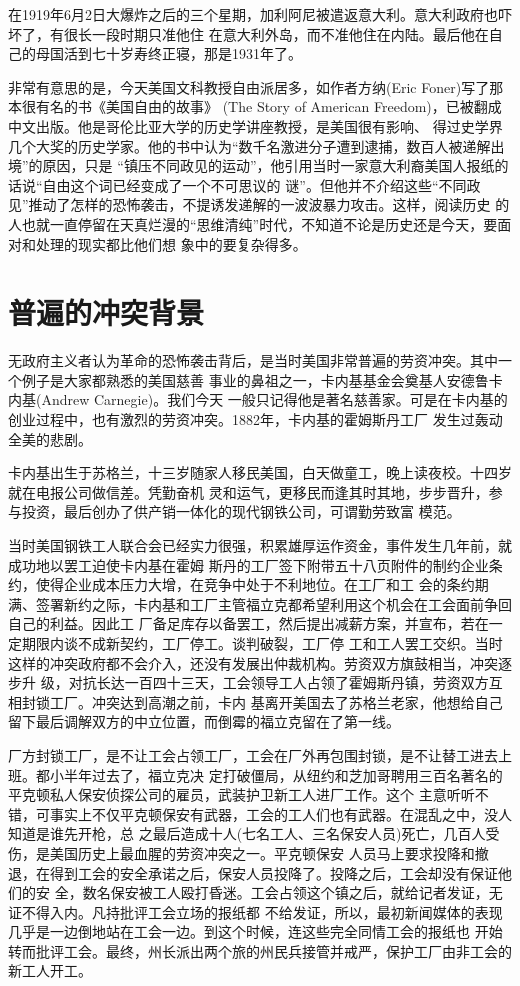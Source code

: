 \documentclass[10pt]{article}
\begin{document}
{在1919年6月2日大爆炸之后的三个星期，加利阿尼被遣返意大利。意大利政府也吓坏了，有很长一段时期只准他住
在意大利外岛，而不准他住在内陆。最后他在自己的母国活到七十岁寿终正寝，那是1931年了。

非常有意思的是，今天美国文科教授自由派居多，如作者方纳(Eric Foner)写了那本很有名的书《美国自由的故事》
(The Story of American Freedom)，已被翻成中文出版。他是哥伦比亚大学的历史学讲座教授，是美国很有影响、
得过史学界几个大奖的历史学家。他的书中认为``数千名激进分子遭到逮捕，数百人被递解出境''的原因，只是
``镇压不同政见的运动''，他引用当时一家意大利裔美国人报纸的话说``自由这个词已经变成了一个不可思议的
谜''。但他并不介绍这些``不同政见''推动了怎样的恐怖袭击，不提诱发递解的一波波暴力攻击。这样，阅读历史
的人也就一直停留在天真烂漫的``思维清纯''时代，不知道不论是历史还是今天，要面对和处理的现实都比他们想
象中的要复杂得多。

\pagebreak
\section{普遍的冲突背景}

无政府主义者认为革命的恐怖袭击背后，是当时美国非常普遍的劳资冲突。其中一个例子是大家都熟悉的美国慈善
事业的鼻祖之一，卡内基基金会奠基人\myrule 安德鲁\textperiodcentered 卡内基(Andrew Carnegie)。我们今天
一般只记得他是著名慈善家。可是在卡内基的创业过程中，也有激烈的劳资冲突。1882年，卡内基的霍姆斯丹工厂
发生过轰动全美的悲剧。

卡内基出生于苏格兰，十三岁随家人移民美国，白天做童工，晚上读夜校。十四岁就在电报公司做信差。凭勤奋机
灵和运气，更移民而逢其时其地，步步晋升，参与投资，最后创办了供产销一体化的现代钢铁公司，可谓勤劳致富
模范。

当时美国钢铁工人联合会已经实力很强，积累雄厚运作资金，事件发生几年前，就成功地以罢工迫使卡内基在霍姆
斯丹的工厂签下附带五十八页附件的制约企业条约，使得企业成本压力大增，在竞争中处于不利地位。在工厂和工
会的条约期满、签署新约之际，卡内基和工厂主管福立克都希望利用这个机会在工会面前争回自己的利益。因此工
厂备足库存以备罢工，然后提出减薪方案，并宣布，若在一定期限内谈不成新契约，工厂停工。谈判破裂，工厂停
工和工人罢工交织。当时这样的冲突政府都不会介入，还没有发展出仲裁机构。劳资双方旗鼓相当，冲突逐步升
级，对抗长达一百四十三天，工会领导工人占领了霍姆斯丹镇，劳资双方互相封锁工厂。冲突达到高潮之前，卡内
基离开美国去了苏格兰老家，他想给自己留下最后调解双方的中立位置，而倒霉的福立克留在了第一线。

厂方封锁工厂，是不让工会占领工厂，工会在厂外再包围封锁，是不让替工进去上班。都小半年过去了，福立克决
定打破僵局，从纽约和芝加哥聘用三百名著名的平克顿私人保安侦探公司的雇员，武装护卫新工人进厂工作。这个
主意听听不错，可事实上不仅平克顿保安有武器，工会的工人们也有武器。在混乱之中，没人知道是谁先开枪，总
之最后造成十人(七名工人、三名保安人员)死亡，几百人受伤，是美国历史上最血腥的劳资冲突之一。平克顿保安
人员马上要求投降和撤退，在得到工会的安全承诺之后，保安人员投降了。投降之后，工会却没有保证他们的安
全，数名保安被工人殴打昏迷。工会占领这个镇之后，就给记者发证，无证不得入内。凡持批评工会立场的报纸都
不给发证，所以，最初新闻媒体的表现几乎是一边倒地站在工会一边。到这个时候，连这些完全同情工会的报纸也
开始转而批评工会。最终，州长派出两个旅的州民兵接管并戒严，保护工厂由非工会的新工人开工。

}
\end{document}
